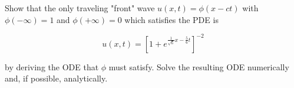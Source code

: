 Show that the only traveling "front" wave $u(x, t) = \phi (x - ct)$ with $\phi(-\infty) = 1$ and $\phi(+\infty) = 0$ 
which satisfies the PDE is

$$
u(x, t) = \left[ 1 + e^{ \frac{1}{\sqrt{6}} x - \frac{5}{6} t } \right]^{-2}
$$

by deriving the ODE that $\phi$ must satisfy. Solve the resulting ODE numerically and, if possible, analytically.

\begin{solution}
    \ \\
    \vfill
\end{solution}
